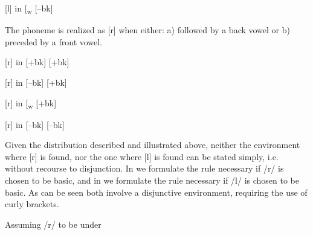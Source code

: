\documentclass[output=paper,modfonts,nonflat,
colorlinks, citecolor=brown,
draftmode,
]{langsci/langscibook}
\begin{document}
\ea\label{ex:bickmore:3} 
[l] in  [\textsubscript{w} {\longrule} [--bk]
\z

The  phoneme is realized as [r] when either: a) followed by a back vowel or b) preceded by a front vowel.

\ea\label{ex:bickmore:4}
[r] in  [+bk] {\longrule} [+bk]
\ea\label{ex:bickmore:4a}
\ex\label{ex:bickmore:4b}
\ex\label{ex:bickmore:4c}
\ex\label{ex:bickmore:4d}
\z
\z

\ea\label{ex:bickmore:5}
[r] in  [--bk] {\longrule} [+bk]
\ea\label{ex:bickmore:5a}
\ex\label{ex:bickmore:5b}
\ex\label{ex:bickmore:5c}
\ex\label{ex:bickmore:5d}
\z
\z

\noindent\parbox{\textwidth}{\ea\label{ex:bickmore:6}
[r] in  [\textsubscript{w}%
%
 {\longrule} [+bk]
\ea\label{ex:bickmore:6a}
\ex\label{ex:bickmore:6b}
\ex\label{ex:bickmore:6c}
\z
\z}

\ea\label{ex:bickmore:7}
[r] in  [--bk] {\longrule} [--bk]
\ea\label{ex:bickmore:7a}
\ex\label{ex:bickmore:7b}
\ex\label{ex:bickmore:7c}
\ex\label{ex:bickmore:7d}
\z
\z

Given the distribution described and illustrated above, neither the environment where [r] is found, nor the one where [l] is found can be stated simply, i.e. without recourse to disjunction. In  we formulate the rule necessary if /r/ is chosen to be basic, and in  we formulate the rule necessary if /l/ is chosen to be basic. As can be seen both involve a disjunctive environment, requiring the use of curly brackets. 


\ea\label{ex:bickmore:8}
  Assuming /r/ to be under    \\ 
\z
\end{document}
